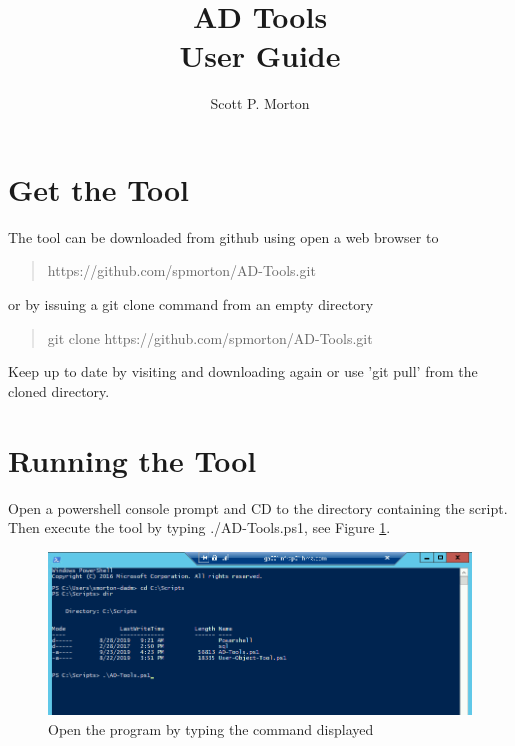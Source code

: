 \documentclass[12pt,a4paper,titlepage]{article}
\begin{document}
	\graphicspath{{images/}{\main/images/}}
	\title{AD Tools\\User Guide}
	\author{Scott P. Morton}
	
	\maketitle
	
	\section{Get the Tool}
	The tool can be downloaded from github using open a web browser to
	\begin{quote}
	https://github.com/spmorton/AD-Tools.git
	\end{quote}
	or by issuing a git clone command from an empty directory
	\begin{quote}
	git clone https://github.com/spmorton/AD-Tools.git
	\end{quote}
	
	Keep up to date by visiting and downloading again or use 'git pull' from the cloned directory.
	
	\section{Running the Tool}
	Open a powershell console prompt and CD to the directory containing the script. Then execute the tool by typing ./AD-Tools.ps1, see Figure \ref{fig:run-prog}.
	
	\begin{figure}[h!]
		\centering
		\includegraphics[width=0.9\linewidth]{run-prog}
		\caption{Open the program by typing the command displayed}
		\label{fig:run-prog}
	\end{figure}
	
\end{document}

